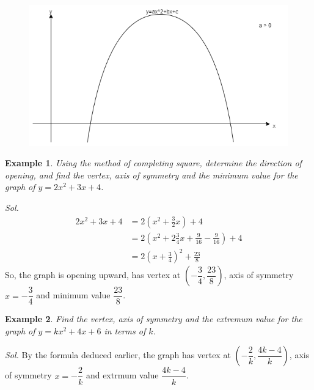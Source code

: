 \documentclass[12pt]{article}
\newtheorem{example}{Example}
\begin{document}
    \begin{figure}[H]
        \centering
        \includegraphics[scale=0.6]{open_downward.png}
    \end{figure}

    \begin{example}
        Using the method of completing square, determine the direction of opening, and find the vertex, axis of symmetry and the minimum value for the graph of $y=2x^2+3x+4$.
    \end{example}

    \textit{ Sol.}\begin{align*}
        2x^2+3x+4&=2(x^2+\frac{3}{2}x)+4\\
        &=2(x^2+2\frac{3}{4}x+\frac{9}{16}-\frac{9}{16})+4\\
        &=2(x+\frac{3}{4})^2+\frac{23}{8}
    \end{align*}
    So, the graph is opening upward, has vertex at $(-\dfrac{3}{4},\dfrac{23}{8})$, axis of symmetry $x=-\dfrac{3}{4}$ and minimum value $\dfrac{23}{8}$.

    \begin{example}
        Find the vertex, axis of symmetry and the extremum value for the graph of $y=kx^2+4x+6$ in terms of $k$.
    \end{example}

    \textit{ Sol.}
    By the formula deduced earlier, the graph has vertex at $(-\dfrac{2}{k},\dfrac{4k-4}{k})$, axis of symmetry $x=-\dfrac{2}{k}$ and extrmum value $\dfrac{4k-4}{k}$.
\end{document}
